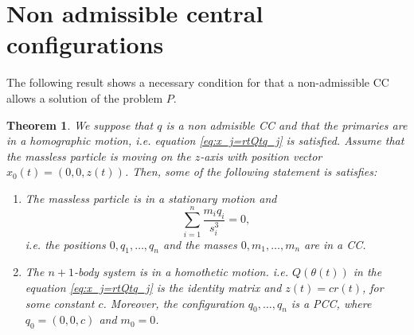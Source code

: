 \documentclass[twoside]{article}
\newtheorem{thm}{Theorem}[section]
\theoremstyle{remark}
\begin{document}
\section{Non admissible central configurations}

The following result shows a necessary condition for that  a non-admissible CC allows a solution of the problem $P$.

\begin{thm}\label{thm:no.admisible.movimiento}
We suppose that $q$ is a non admisible CC and  that the primaries are in a homographic motion, i.e.  equation \eqref{eq:x_j=rtQtq_j} is satisfied. Assume that the massless particle is moving on the $z$-axis with position vector $x_0(t)=(0,0,z(t))$. Then, some of the following statement is satisfies:
\begin{enumerate}
 \item\label{it:z==0} The massless particle is in a stationary motion and
 \begin{equation}\label{eq:acel.centrmasa=0}
  \sum_{i=1}^{n}\frac{m_iq_i}{s_i^3}=0,
 \end{equation}
 i.e. the positions $0,q_1,\ldots,q_n$ and the masses $0,m_1,\ldots,m_n$ are in a CC.
 \item\label{it:z=r} The $n+1$-body system is in a homothetic motion. i.e. $Q(\theta(t))$ in the equation \eqref{eq:x_j=rtQtq_j} is the identity matrix and $z(t)=cr(t)$, for some constant $c$. Moreover, the configuration $q_0,\ldots,q_n$ is a PCC, where $q_0=(0,0,c)$ and $m_0=0$.
\end{enumerate}
\end{thm}
\end{document}
